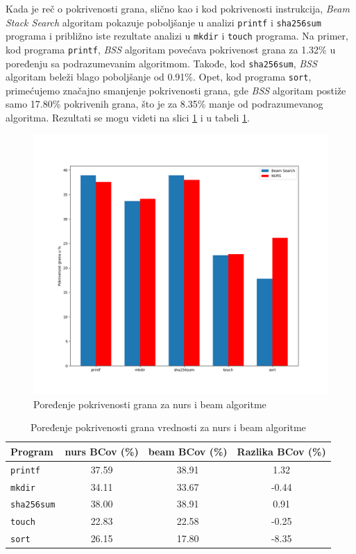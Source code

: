 \documentclass[a4paper]{article}
\begin{document}
Kada je reč o pokrivenosti grana, slično kao i kod pokrivenosti instrukcija, \textit{Beam Stack Search} algoritam pokazuje poboljšanje u analizi \verb|printf| i \verb|sha256sum| programa i približno iste rezultate analizi u \verb|mkdir| i \verb|touch| programa. Na primer, kod programa \verb|printf|, \textit{BSS} algoritam povećava pokrivenost grana za 1.32\% u poređenju sa podrazumevanim algoritmom. Takođe, kod \verb|sha256sum|, \textit{BSS} algoritam beleži blago poboljšanje od 0.91\%. Opet, kod programa \verb|sort|, primećujemo značajno smanjenje pokrivenosti grana, gde \textit{BSS} algoritam postiže samo 17.80\% pokrivenih grana, što je za 8.35\% manje od podrazumevanog algoritma. Rezultati se mogu videti na slici \ref{fig:bcov_comparison} i u tabeli \ref{tab:bcov_comparison}.

\begin{figure}[h!]
    \centering
    \includegraphics[width=\linewidth]{ilustracije/BCov.png}
    \caption{Poređenje pokrivenosti grana za nurs i beam algoritme}
    \label{fig:bcov_comparison}
\end{figure}

\begin{table}[h!]
\centering
\begin{tabular}{|l|c|c|c|}
\hline
\textbf{Program} & \textbf{nurs BCov (\%)} & \textbf{beam BCov (\%)} & \textbf{Razlika BCov (\%)} \\ \hline
\texttt{printf} & 37.59 & 38.91 & 1.32 \\ \hline
\texttt{mkdir} & 34.11 & 33.67 & -0.44 \\ \hline
\texttt{sha256sum} & 38.00 & 38.91 & 0.91 \\ \hline
\texttt{touch} & 22.83 & 22.58 & -0.25 \\ \hline
\texttt{sort} & 26.15 & 17.80 & -8.35 \\ \hline
\end{tabular}
\caption{Poređenje pokrivenosti grana vrednosti za nurs i beam algoritme}
\label{tab:bcov_comparison}
\end{table}
\end{document}
